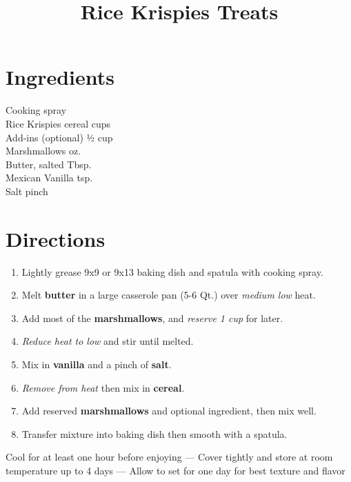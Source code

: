 \documentclass[11pt,letterpaper]{article}
\title{Rice Krispies Treats}
\author{}
\date{}
\begin{document}
\maketitle
\thispagestyle{empty}

\section*{Ingredients}
\setlength{\columnsep}{20pt}
\begin{multicols}{2}
\noindent
	Cooking spray \dotfill \\
	Rice Krispies cereal  cups \\
	Add-ins (optional) \dotfill ½ cup \\
	Marshmallows  oz. \\
	Butter, salted  Tbsp. \\
	Mexican Vanilla  tsp. \\
	Salt \dotfill pinch \\

\end{multicols}

\section*{Directions}

\begin{enumerate}
	\item Lightly grease 9x9 or 9x13 baking dish and spatula with cooking spray.
	\item Melt \textbf{butter} in a large casserole pan (5-6 Qt.) over \textit{medium low} heat.
	\item Add most of the \textbf{marshmallows}, and \textit{reserve 1 cup} for later.
	\item \textit{Reduce heat to low} and stir until melted.
	\item Mix in \textbf{vanilla} and a pinch of \textbf{salt}.
	\item \textit{Remove from heat} then mix in \textbf{cereal}.
	\item Add reserved \textbf{marshmallows} and optional ingredient, then mix well.
	\item Transfer mixture into baking dish then smooth with a spatula.
\end{enumerate}

Cool for at least one hour before enjoying ---
Cover tightly and store at room temperature up to 4 days ---
Allow to set for one day for best texture and flavor
\end{document}
